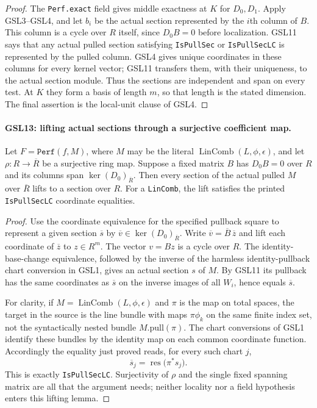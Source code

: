 \documentclass[11pt,a4paper]{article}
\numberwithin{equation}{section}
\theoremstyle{remark}\newtheorem{remark}[theorem]{Remark}
\begin{document}
\begin{proof}
The \texttt{Perf.\allowbreak exact} field gives middle exactness at $K$ for
$D_0,D_1$.  Apply GSL3--GSL4, and let $b_i$ be the actual section
represented by the $i$th column of $B$.  This column is a cycle
over $R$ itself, since $D_0B=0$ before localization.  GSL11 says
that any actual pulled section satisfying \texttt{Is\allowbreak Pull\allowbreak Sec} or
\texttt{Is\allowbreak Pull\allowbreak Sec\allowbreak LC} is represented by the pulled column.  GSL4
gives unique coordinates in these columns for every kernel vector;
GSL11 transfers them, with their uniqueness, to the actual section
module.  Thus the sections are independent and span on every test.
At $K$ they form a basis of length $m$, so that length is the stated
dimension.  The final assertion is the local-unit clause of GSL4.
\end{proof}

\paragraph{GSL13: lifting actual sections through a surjective coefficient map.}
\label{claim:GSL13}
Let $F=\texttt{Perf}(f,M)$, where $M$ may be the literal
$\operatorname{LinComb}(L,\phi,\epsilon)$, and let
$\rho:R\to\overline R$ be a surjective ring map.  Suppose a fixed
matrix $B$ has $D_0B=0$ over $R$ and its columns span
$\ker(D_0)_{\overline R}$.  Then every section of the actual pulled
$M$ over $\overline R$ lifts to a section over $R$.  For a
\texttt{Lin\allowbreak Comb}, the lift satisfies the printed
\texttt{Is\allowbreak Pull\allowbreak Sec\allowbreak LC} coordinate equalities.

\begin{proof}
Use the coordinate equivalence for the specified pullback square
to represent a given section $\overline s$ by
$\overline v\in\ker(D_0)_{\overline R}$.  Write
$\overline v=\overline B\,\overline z$ and lift each coordinate
of $\overline z$ to $z\in R^m$.  The vector $v=Bz$ is a cycle
over $R$.  The identity-base-change equivalence, followed by the
inverse of the harmless identity-pullback chart conversion in GSL1,
gives an actual section $s$ of $M$.  By GSL11 its pullback has the
same coordinates as $\overline s$ on the inverse images of all
$W_i$, hence equals $\overline s$.

For clarity, if $M=\operatorname{LinComb}(L,\phi,\epsilon)$ and
$\pi$ is the map on total spaces, the target in the source is the
line bundle with maps $\pi\phi_k$ on the same finite index set, not
the syntactically nested bundle $M.\mathrm{pull}(\pi)$.  The chart
conversions of GSL1 identify these bundles by the identity map on
each common coordinate function.  Accordingly the equality just
proved reads, for every such chart $j$,
\[
 \overline s_j
   =\operatorname{res}\bigl(\pi^*s_j\bigr).
 \tag{GSL.7}
\]
This is exactly \texttt{Is\allowbreak Pull\allowbreak Sec\allowbreak LC}.  Surjectivity of $\rho$ and
the single fixed spanning matrix are all that the argument needs;
neither locality nor a field hypothesis enters this lifting lemma.
\end{proof}
\end{document}
